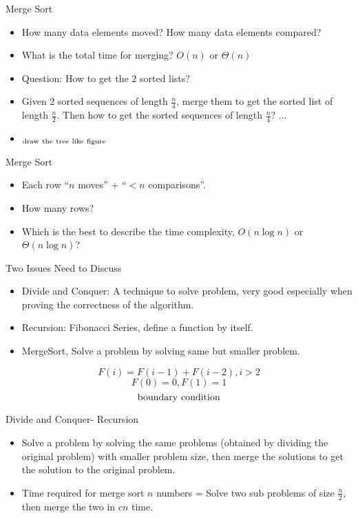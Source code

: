 \documentclass{beamer}
\begin{document}
\begin{frame}{}
\begin{center}
{ Merge Sort}
\end{center}
\begin{itemize}
\item How many data elements moved? How many data elements compared?
\item What is the total time for merging? $O(n)$ or $\Theta(n)$
\item Question: How to get the 2 sorted lists?
\item { Given 2 sorted sequences of length $\frac{n}{4}$, merge them
  to get the sorted list of length $\frac{n}{2}$. Then how to get the
  sorted sequences of length $\frac{n}{4}$? ...}
\item $_{\rm draw\ the\ tree\ like\ figure}$
\end{itemize}
\end{frame}

\begin{frame}{}
\begin{center}
Merge Sort
\end{center}
\begin{itemize}
\item Each row ``$n$ moves'' + ``$<n$ comparisons''.  
\item How many rows?
\item Which is the best to describe the time complexity, $O(n\log n)$ or 
 $\Theta(n\log n)$?
\end{itemize}
\end{frame}

\begin{frame}{}
\begin{center}
Two Issues Need to Discuss
\end{center}
\begin{itemize}
\item Divide and Conquer: A technique to solve problem, very good especially
 when proving the correctness of the algorithm. 
\item Recursion: Fibonacci Series, define a function by itself.  
\item MergeSort, Solve a problem 
 by solving same but smaller problem. 
\end{itemize}
$$F(i)=F(i-1)+F(i-2), i>2$$
$$ F(0)=0, F(1)=1 $$
$${\rm boundary\ condition}$$
\end{frame}

\begin{frame}{}
\begin{center}
Divide and Conquer- Recursion
\end{center}
\begin{itemize}
\item Solve a problem by solving the same problems (obtained by dividing the original
 problem) with smaller problem size,
 then merge the solutions to get the solution to the original problem.
\item Time required for merge sort $n$ numbers = 
  Solve two sub problems of size $\frac{n}{2}$, then merge the two in $cn$ time.
\end{itemize}
\end{frame}
\end{document}
